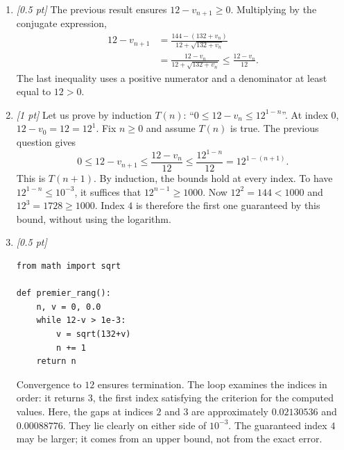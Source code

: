 \begin{enumerate}
\item \textit{[0.5 pt]} The previous result ensures $12-v_{n+1}\ge0$. Multiplying by the conjugate expression,
\[\begin{aligned}12-v_{n+1}&=\frac{144-(132+v_n)}{12+\sqrt{132+v_n}}\\&=\frac{12-v_n}{12+\sqrt{132+v_n}}\le\frac{12-v_n}{12}.\end{aligned}\]
The last inequality uses a positive numerator and a denominator at least equal to $12>0$.

\item \textit{[1 pt]} Let us prove by induction $T(n)$: ``$0\le 12-v_n\le 12^{1-n}$''.
At index $0$, $12-v_0=12=12^1$. Fix $n\ge0$ and assume $T(n)$ is true. The previous question gives
\[0\le 12-v_{n+1}\le\frac{12-v_n}{12}\le\frac{12^{1-n}}{12}=12^{1-(n+1)}.\]
This is $T(n+1)$. By induction, the bounds hold at every index.
To have $12^{1-n}\le10^{-3}$, it suffices that $12^{n-1}\ge1000$.
Now $12^{2}=144<1000$ and $12^{3}=1728\ge1000$. Index $4$ is therefore the first one guaranteed by this bound, without using the logarithm.


\item \textit{[0.5 pt]} 
\begin{lstlisting}
from math import sqrt

def premier_rang():
    n, v = 0, 0.0
    while 12-v > 1e-3:
        v = sqrt(132+v)
        n += 1
    return n
\end{lstlisting}
Convergence to $12$ ensures termination. The loop examines the indices in order: it returns $3$, the first index satisfying the criterion for the computed values. Here, the gaps at indices $2$ and $3$ are approximately $\num{0,02130536}$ and $\num{0,00088776}$. They lie clearly on either side of $10^{-3}$. The guaranteed index $4$ may be larger; it comes from an upper bound, not from the exact error.

\end{enumerate}

